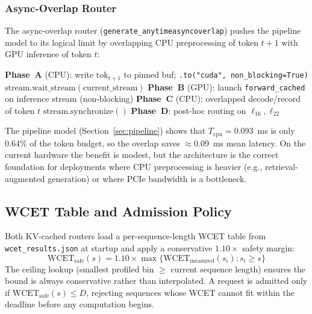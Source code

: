 \documentclass[conference]{IEEEtran}
\begin{document}
\subsubsection{Async-Overlap Router}

The async-overlap router (\texttt{generate\_anytime\discretionary{\_}{}{\_}async\discretionary{\_}{}{\_}overlap})
pushes the pipeline model to its logical limit by overlapping CPU
preprocessing of token $t{+}1$ with GPU inference of token $t$:

\begin{algorithmic}[1]
\STATE \textbf{Phase~A} (CPU): write $\text{tok}_{t+1}$ to pinned buf;
       \texttt{.to("cuda", non\_blocking=True)}
\STATE $\text{stream.wait\_stream}(\text{current\_stream})$
\STATE \textbf{Phase~B} (GPU): launch \texttt{forward\_cached}
       on inference stream (non-blocking)
\STATE \textbf{Phase~C} (CPU): overlapped decode/record of token $t$
\STATE $\text{stream.synchronize}()$
\STATE \textbf{Phase~D}: post-hoc routing on $\ell_{16}, \ell_{22}$
\end{algorithmic}

The pipeline model (Section~\ref{sec:pipeline}) shows that
$T_{\text{cpu}} = 0.093$~ms is only 0.64\% of the token budget,
so the overlap saves $\approx$0.09~ms mean latency.
On the current hardware the benefit is modest, but the architecture
is the correct foundation for deployments where CPU preprocessing
is heavier (e.g., retrieval-augmented generation) or where PCIe
bandwidth is a bottleneck.

\subsection{WCET Table and Admission Policy}

Both KV-cached routers load a per-sequence-length WCET table from
\texttt{wcet\_results.json} at startup and apply a conservative
$1.10\times$ safety margin:
\begin{equation}
\text{WCET}_{\text{safe}}(s) = 1.10 \times
    \max\bigl\{\text{WCET}_{\text{measured}}(s_i) : s_i \geq s\bigr\}
\label{eq:wcet_safe}
\end{equation}
The ceiling lookup (smallest profiled bin $\geq$ current sequence length)
ensures the bound is always conservative rather than interpolated.
A request is admitted only if $\text{WCET}_{\text{safe}}(s) \leq D$,
rejecting sequences whose WCET cannot fit within the deadline before
any computation begins.
\end{document}
